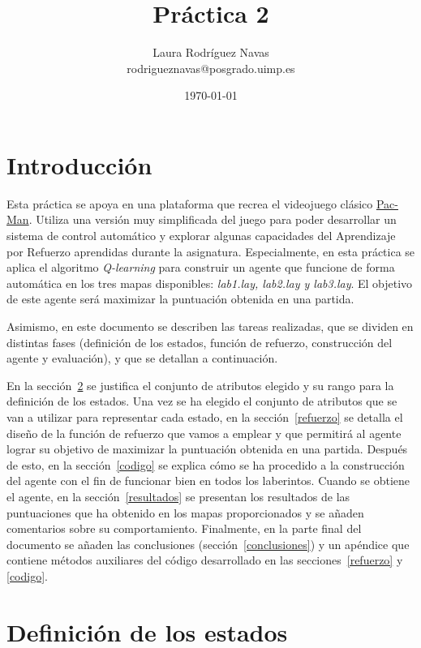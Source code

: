 \documentclass[11pt]{exam}
\title{Práctica 2}
\author{Laura Rodríguez Navas \\ rodrigueznavas@posgrado.uimp.es}
\date{{\selectlanguage{spanish}\today} }
\begin{document}
	
\maketitle

\section{Introducción}\label{introduccion}

Esta práctica se apoya en una plataforma que recrea el videojuego clásico \href{1https://en.wikipedia.org/wiki/Pac-Man}{Pac-Man}. Utiliza una versión muy simplificada del juego para poder desarrollar un sistema de control automático y explorar algunas capacidades del Aprendizaje por Refuerzo aprendidas durante la asignatura. Especialmente, en esta práctica se aplica el algoritmo \textit{Q-learning} para construir un agente que funcione de forma automática en los tres mapas disponibles: \textit{lab1.lay, lab2.lay y lab3.lay}. El objetivo de este agente será maximizar la puntuación obtenida en una partida.

Asimismo, en este documento se describen las tareas realizadas, que se dividen en distintas fases (definición de los estados, función de refuerzo, construcción del agente y evaluación), y que se detallan a continuación.

En la sección~\ref{estados} se justifica el conjunto de atributos elegido y su rango para la definición de los estados. Una vez se ha elegido el conjunto de atributos que se van a utilizar para representar cada estado, en la sección~\ref{refuerzo} se detalla el diseño de la función de refuerzo que vamos a emplear y que permitirá al agente lograr su objetivo de maximizar la puntuación obtenida en una partida. Después de esto, en la sección~\ref{codigo} se explica cómo se ha procedido a la construcción del agente con el fin de funcionar bien en todos los laberintos. Cuando se obtiene el agente, en la sección~\ref{resultados} se presentan los resultados de las puntuaciones que ha obtenido en los mapas proporcionados y se añaden comentarios sobre su comportamiento. Finalmente, en la parte final del documento se añaden las conclusiones (sección~\ref{conclusiones}) y un apéndice que contiene métodos auxiliares del código desarrollado en las secciones~\ref{refuerzo} y \ref{codigo}.

\section{Definición de los estados}\label{estados}
\end{document}

